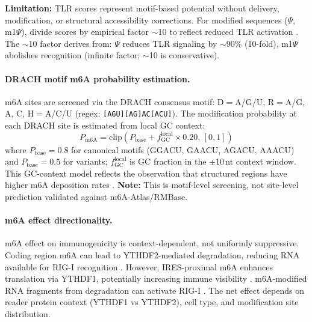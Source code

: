 \textbf{Limitation:} TLR scores represent motif-based potential without delivery, modification, or structural accessibility corrections. For modified sequences ($\Psi$, m1$\Psi$), divide scores by empirical factor $\sim$10 to reflect reduced TLR activation \citep{anderson2019,kariko2005}. The $\sim$10 factor derives from: $\Psi$ reduces TLR signaling by $\sim$90\% (10-fold), m1$\Psi$ abolishes recognition (infinite factor; $\sim$10 is conservative).

\paragraph{DRACH motif m6A probability estimation.}
m6A sites are screened via the DRACH consensus motif: D$=$A/G/U, R$=$A/G, A, C, H$=$A/C/U (regex: \texttt{[AGU][AG]AC[ACU]}). The modification probability at each DRACH site is estimated from local GC context:
\begin{equation}
P_{\text{m6A}} = \text{clip}\left( P_{\text{base}} + f_{\text{GC}}^{\text{local}} \times 0.20, \, [0, 1] \right)
\end{equation}
where $P_{\text{base}}=0.8$ for canonical motifs (GGACU, GAACU, AGACU, AAACU) and $P_{\text{base}}=0.5$ for variants; $f_{\text{GC}}^{\text{local}}$ is GC fraction in the $\pm$10\,nt context window. This GC-context model reflects the observation that structured regions have higher m6A deposition rates \citep{liu2022}. \textbf{Note:} This is motif-level screening, not site-level prediction validated against m6A-Atlas/RMBase.

\paragraph{m6A effect directionality.}
m6A effect on immunogenicity is context-dependent, not uniformly suppressive. Coding region m6A can lead to YTHDF2-mediated degradation, reducing RNA available for RIG-I recognition \citep{chen2019}. However, IRES-proximal m6A enhances translation via YTHDF1, potentially increasing immune visibility \citep{meyer2015}. m6A-modified RNA fragments from degradation can activate RIG-I \citep{liu2022}. The net effect depends on reader protein context (YTHDF1 vs YTHDF2), cell type, and modification site distribution.

